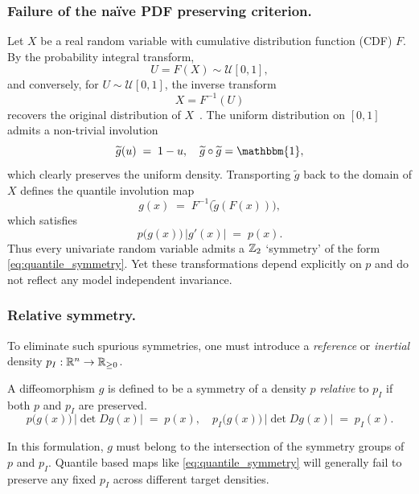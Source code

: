 \subsubsection{Failure of the na\"ive PDF preserving criterion.}
    Let $X$ be a real random variable with cumulative distribution function (CDF) $F$.  By the probability integral transform,
    \begin{equation}
        U = F(X) \sim \mathcal{U}[0,1],
    \end{equation}
    and conversely, for $U\sim \mathcal{U}[0,1]$, the inverse transform
    \begin{equation}
        X = F^{-1}(U)
    \end{equation}
recovers the original distribution of $X$~\cite{Casella2024StatisticalEdition}. 
%
The uniform distribution on $[0,1]$ admits a non-trivial involution
\begin{equation}
    \widetilde{g}(u) \;=\; 1 - u,
    \quad
    \widetilde{g}\circ \widetilde{g} = \mathbbm{1},
\end{equation}
which clearly preserves the uniform density.
%
Transporting $\widetilde{g}$ back to the domain of $X$ defines the quantile involution map
\begin{equation}
    \label{eq:quantile_symmetry}
    g(x) \;=\; F^{-1}\bigl(\widetilde{g}(F(x))\bigr),
\end{equation}
which satisfies
\[
    p\bigl(g(x)\bigr)\,\bigl|g'(x)\bigr|
    \;=\; p(x).
\]
Thus every univariate random variable admits a $\mathbb{Z}_2$ `symmetry' of the form \eqref{eq:quantile_symmetry}.
%
Yet these transformations depend explicitly on $p$ and do not reflect any model independent invariance.

\subsubsection{Relative symmetry.}
    To eliminate such spurious symmetries, one must introduce a \emph{reference} or \emph{inertial} density $p_I : \mathbb{R}^n \to \mathbb{R}_{\ge0}$. 
    \begin{definition}
        A diffeomorphism $g$ is defined to be a symmetry of a density $p$ \emph{relative} to $p_I$ if both $p$ and $p_I$ are preserved.
    \begin{equation}\label{eq:relative_symmetry}
        p\bigl(g(x)\bigr)\,\bigl|\det Dg(x)\bigr|
        \;=\; p(x),
        \quad
        p_I\bigl(g(x)\bigr)\,\bigl|\det Dg(x)\bigr|
        \;=\; p_I(x).
    \end{equation}
    \end{definition}
In this formulation, $g$ must belong to the intersection of the symmetry groups of $p$ and $p_I$.
%
Quantile based maps like \cref{eq:quantile_symmetry} will generally fail to preserve any fixed $p_I$ across different target densities.

